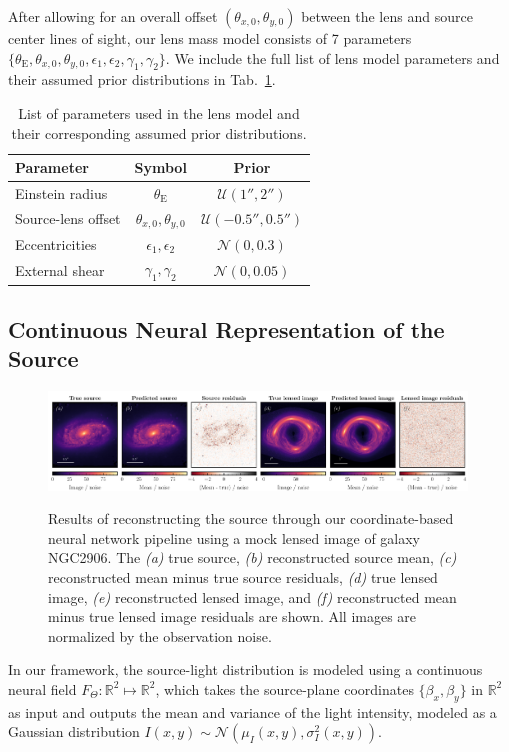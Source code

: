 \documentclass[nohyperref]{article}
\theoremstyle{plain}
\theoremstyle{definition}
\theoremstyle{remark}
\begin{document}
After allowing for an overall offset $\left(\theta_{x,0}, \theta_{y,0}\right)$ between the lens and source center lines of sight, our lens mass model consists of 7 parameters $\{\theta_\mathrm{E}, \theta_{x,0}, \theta_{y,0}, \epsilon_1, \epsilon_2, \gamma_1, \gamma_2\}$. 
We include the full list of lens model parameters and their assumed prior distributions in Tab.~\ref{tab:lens_params}.
\begin{table}[t]
\centering
\caption{List of parameters used in the lens model and their corresponding assumed prior distributions.}
\begin{tabular}[t]{lcc}
\toprule
Parameter & Symbol & Prior\\
\midrule
Einstein radius & \(\theta_{\mathrm E}\) & $\mathcal U(1'', 2'')$ \\
Source-lens offset &\(\theta_{x,0}, \theta_{y,0}\) & $\mathcal U(-0.5'', 0.5'')$ \\
Eccentricities & \(\epsilon_1, \epsilon_2\)& $\mathcal N(0, 0.3)$\\
External shear &\(\gamma_1, \gamma_2\) & $\mathcal N(0, 0.05)$ \\
\bottomrule
\end{tabular}
\label{tab:lens_params}
\end{table}

\subsection{Continuous Neural Representation of the Source}\label{sec:continuous}

\begin{figure}[!t]
\centering
\includegraphics[width=0.99\textwidth]{figures/reconstruction.pdf} \\
\caption{Results of reconstructing the source through our coordinate-based neural network pipeline using a mock lensed image of galaxy NGC2906. The \emph{(a)} true source, \emph{(b)}  reconstructed source mean, \emph{(c)}  reconstructed mean minus true source residuals,  \emph{(d)} true lensed image,  \emph{(e)} reconstructed lensed image, and  \emph{(f)} reconstructed mean minus true lensed image residuals are shown. All images are normalized by the observation noise.}\label{fig:reconstruction}
\end{figure}
In our framework, the source-light distribution is modeled using a continuous neural field  $F_\Theta: \mathbb R^2 \mapsto \mathbb R^2$, which takes the source-plane coordinates $\{\beta_x, \beta_y\}$ in \(\mathbb R^2\) as input and outputs the mean and variance of the light intensity, modeled as a Gaussian distribution $I({x, y}) \sim \mathcal N\left(\mu_I({x, y}), \sigma^2_I({x, y})\right)$.
\end{document}
